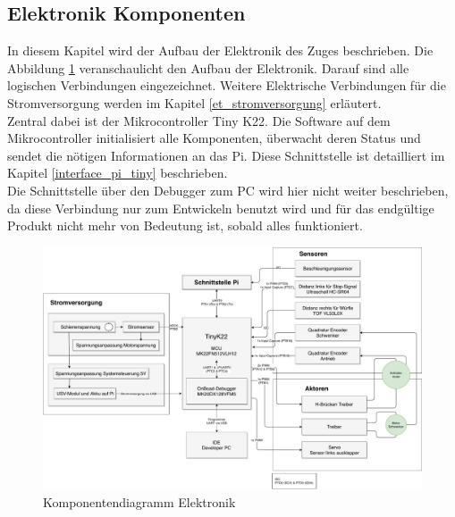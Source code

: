 \documentclass[../../main.tex]{subfiles}
\begin{document}
    \subsection{Elektronik Komponenten}
    In diesem Kapitel wird der Aufbau der Elektronik des Zuges beschrieben. Die Abbildung \ref{fig:et_komponenten} veranschaulicht den Aufbau der Elektronik. Darauf sind alle logischen Verbindungen eingezeichnet. Weitere Elektrische Verbindungen für die Stromversorgung werden im Kapitel \ref{et_stromversorgung} erläutert.\\
    Zentral dabei ist der Mikrocontroller Tiny K22. Die Software auf dem Mikrocontroller initialisiert alle Komponenten, überwacht deren Status und sendet die nötigen Informationen an  das Pi. Diese Schnittstelle ist detailliert im Kapitel \ref{interface_pi_tiny} beschrieben.\\
    Die Schnittstelle über den Debugger zum PC wird hier nicht weiter beschrieben, da diese Verbindung nur zum Entwickeln benutzt wird und für das endgültige Produkt nicht mehr von Bedeutung ist, sobald alles funktioniert.

    \begin{figure}[H]
        \centering
        \includegraphics[width=1.0\textwidth]{../../drawings/KomponentenDiagramm/KomponentenDiagramm_ET.pdf}
        \caption {Komponentendiagramm Elektronik}
        \label{fig:et_komponenten}
    \end{figure}
\end{document}
